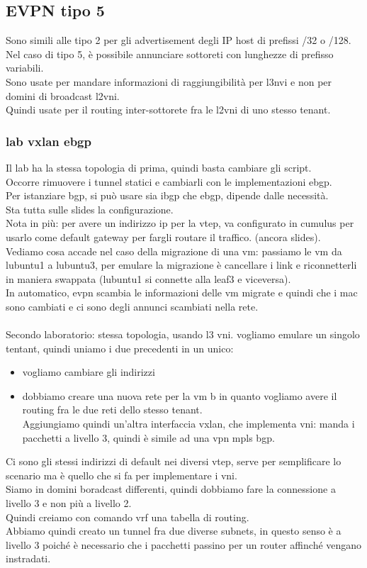 \documentclass[12pt, oneside]{extbook} %
\begin{document}
\subsection{EVPN tipo 5}
Sono simili alle tipo 2 per gli advertisement degli IP host di prefissi /32 o /128.
\\Nel caso di tipo 5, è possibile annunciare sottoreti con lunghezze di prefisso variabili.
\\Sono usate per mandare informazioni di raggiungibilità per l3nvi e non per domini di broadcast l2vni.
\\Quindi usate per il routing inter-sottorete fra le l2vni di uno stesso tenant.


\subsubsection{lab vxlan ebgp}
Il lab ha la stessa topologia di prima, quindi basta cambiare gli script.
\\Occorre rimuovere i tunnel statici e cambiarli con le implementazioni ebgp.
\\Per istanziare bgp, si può usare sia ibgp che ebgp, dipende dalle necessità.
\\Sta tutta sulle slides la configurazione.
\\Nota in più: per avere un indirizzo ip per la vtep, va configurato in cumulus per usarlo come default gateway per fargli routare il traffico. (ancora slides).
\\Vediamo cosa accade nel caso della migrazione di una vm: passiamo le vm da lubuntu1 a lubuntu3, per emulare la migrazione è cancellare i link e riconnetterli in maniera swappata (lubuntu1 si connette alla leaf3 e viceversa).
\\In automatico, evpn scambia le informazioni delle vm migrate e quindi che i mac sono cambiati e ci sono degli annunci scambiati nella rete.
\\\\Secondo laboratorio: stessa topologia, usando l3 vni. vogliamo emulare un singolo tentant, quindi uniamo i due precedenti in un unico:
\begin{itemize}
    \item vogliamo cambiare gli indirizzi
    \item dobbiamo creare una nuova rete per la vm b in quanto vogliamo avere il routing fra le due reti dello stesso tenant.
    \\Aggiungiamo quindi un'altra interfaccia vxlan, che implementa vni: manda i pacchetti a livello 3, quindi è simile ad una vpn mpls bgp.
\end{itemize}
Ci sono gli stessi indirizzi di default nei diversi vtep, serve per semplificare lo scenario ma è quello che si fa per implementare i vni.
\\Siamo in domini boradcast differenti, quindi dobbiamo fare la connessione a livello 3 e non più a livello 2.
\\Quindi creiamo con comando vrf una tabella di routing.
\\Abbiamo quindi creato un tunnel fra due diverse subnets, in questo senso è a livello 3 poiché è necessario che i pacchetti passino per un router affinché vengano instradati.
\end{document}
